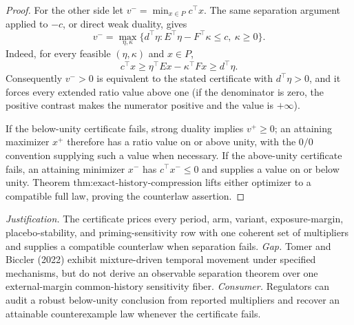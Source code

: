 \documentclass{article}
\begin{document}
\begin{proof}
For the other side let \(v^-=\min_{x\in P}c^\top x\).  The same separation argument applied to \(-c\), or direct weak duality, gives
\[
v^-=\max_{\eta,\kappa}\{d^\top\eta:
E^\top\eta-F^\top\kappa\leq c,\ \kappa\geq0\}.
\]
Indeed, for every feasible \((\eta,\kappa)\) and \(x\in P\),
\[
c^\top x\geq\eta^\top Ex-\kappa^\top Fx
\geq d^\top\eta.
\]
Consequently \(v^->0\) is equivalent to the stated certificate with \(d^\top\eta>0\), and it forces every extended ratio value above one (if the denominator is zero, the positive contrast makes the numerator positive and the value is \(+\infty\)).

If the below-unity certificate fails, strong duality implies \(v^+\geq0\); an attaining maximizer \(x^+\) therefore has a ratio value on or above unity, with the \(0/0\) convention supplying such a value when necessary.  If the above-unity certificate fails, an attaining minimizer \(x^-\) has \(c^\top x^-\leq0\) and supplies a value on or below unity.  Theorem \(\text{thm:exact-history-compression}\) lifts either optimizer to a compatible full law, proving the counterlaw assertion.
\end{proof}
\par\smallskip\noindent \textit{Justification.} The certificate prices every period, arm, variant, exposure-margin, placebo-stability, and priming-sensitivity row with one coherent set of multipliers and supplies a compatible counterlaw when separation fails. \textit{Gap.} Tomer and Biccler (2022) exhibit mixture-driven temporal movement under specified mechanisms, but do not derive an observable separation theorem over one external-margin common-history sensitivity fiber. \textit{Consumer.} Regulators can audit a robust below-unity conclusion from reported multipliers and recover an attainable counterexample law whenever the certificate fails.
\end{document}
